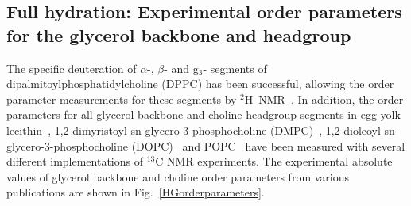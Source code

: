 \documentclass[pre,aps,floatfix,authordate1-4,twocolumn]{revtex4-1}
\begin{document}
\subsection{Full hydration: Experimental order parameters for the glycerol backbone and headgroup}\label{experiments}
The specific deuteration of $\alpha$-, $\beta$- and g$_3$- segments of dipalmitoylphosphatidylcholine (DPPC) has been successful, 
allowing the order parameter measurements for these segments by $^2$H--NMR~\cite{gally75,brown77,brown78,akutsu81}.
In addition, the order parameters for all glycerol backbone and choline headgroup segments in egg yolk lecithin~\cite{hong95a},
1,2-dimyristoyl-sn-glycero-3-phosphocholine (DMPC)~\cite{hong95b,gross97,dvinskikh05a}, 
1,2-dioleoyl-sn-glycero-3-phosphocholine (DOPC)~\cite{warschawski05} and POPC~\cite{warschawski05,ferreira13}
have been measured with several different implementations of $^{13}$C NMR experiments.
The experimental absolute values of glycerol backbone and choline order parameters from various publications are shown in Fig.~\ref{HGorderparameters}.
\end{document}
